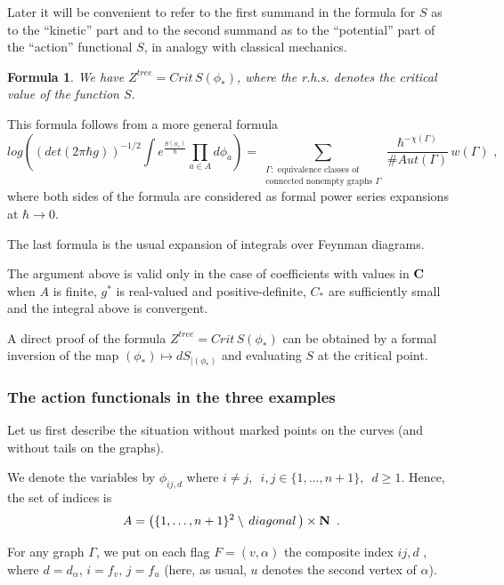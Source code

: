 \documentclass{amsart}
\newtheorem*{formula}{Formula}
\begin{document}
Later it will be convenient to refer to the first summand in the formula for
$S$ as to the ``kinetic'' part and to the second summand
 as to the ``potential'' part of the ``action'' functional $S$, in analogy with
 classical mechanics.

\begin{formula} We have $Z^{tree}=Crit\,S(\phi_*)$, where the r.h.s. denotes
the critical value of
 the function $S$.
\end{formula}

This formula follows from a more general formula
$$ log\left((det(2\pi \hbar g))^{-1/2}\int
e^{\frac{S(\phi_*)}{\hbar}}\prod_{a\in A}d\phi_a\right)=
\sum_{\substack{
\Gamma:\text{ equivalence classes of}
\\ \text{connected nonempty graphs }\Gamma
}} 
\frac{\hbar^{-\chi(\Gamma)}}{\# Aut(\Gamma)}\,w(\Gamma)\,\,,$$
 where both sides of the formula are considered as formal power series
expansions at $\hbar\to 0$.

The last formula is the usual expansion of integrals over Feynman diagrams.

The argument above is valid only in the case of coefficients with values in
$\mathbf C$ when $A$ is finite, $g^*$ is real-valued and positive-definite,
 $C_*$ are sufficiently small
 and the integral above is convergent.


A direct proof of the formula $Z^{tree}=Crit\,S(\phi_*)$ can be obtained by a
formal inversion of the map $(\phi_*)\mapsto dS_{|(\phi_*)}$ and evaluating $S$
at the critical point.

\subsubsection{The action functionals in the three examples}

Let us first describe the situation without marked points on the curves (and
without tails on the graphs).


We denote the  variables by $\phi_{ij,d}$ where $i\ne j,\,\,\,i,j\in
\{1,\dots,n+1\},\,\,\,d\ge 1$. Hence,
 the set of indices is
$$A= \left(\{1,\dots,n+1\}^2\setminus\,diagonal\,\right)\times\bold N\,\,\,.$$

For any graph $\Gamma$, we put on each flag $F=(v,\alpha)$
 the composite index $ij,d\,\,$, where $d=d_{\alpha},\,i=f_v,\,j=f_u$ (here, as
usual, $u$ denotes the second vertex of $\alpha$).
\end{document}
